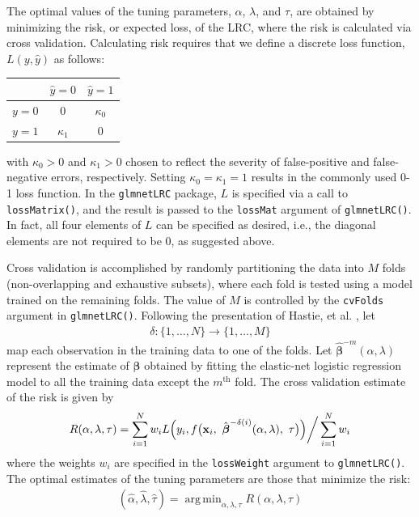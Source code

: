 \documentclass{article}
\DeclareMathOperator*{\argmin}{arg\,min}
\begin{document}
The optimal values of the tuning parameters, $\alpha$, $\lambda$, and $\tau$, are obtained by minimizing 
the risk, or expected loss, of 
the LRC, where the risk is calculated via cross validation.  Calculating risk requires that we define a discrete 
loss function, $L(y,\hat{y})$ as follows:
\begin{table}[H]
\begin{center}
\begin{tabular}{c|cc}
& $\hat{y} = 0$ & $\hat{y} = 1$ \\
\hline
$y = 0$ & $0$ & $\kappa_0$ \\
$y = 1$ & $\kappa_1$ & $0$ \\
\end{tabular}
\end{center}
\end{table}
\noindent with $\kappa_0 > 0$ and $\kappa_1 > 0$ chosen to reflect the severity of false-positive and 
false-negative errors, respectively.  Setting $\kappa_0 = \kappa_1 = 1$ results in the commonly used 0-1 loss
function.  In the {\tt glmnetLRC} package, $L$ is specified via a call to {\tt lossMatrix()}, and the result is passed to
the {\tt lossMat} argument of {\tt glmnetLRC()}.  In fact, all four elements of $L$ can be specified as desired, i.e.,
the diagonal elements are not required to be 0, as suggested above.

Cross validation is accomplished by randomly partitioning the data into $M$ folds (non-overlapping and
exhaustive subsets), where each fold is tested using a model trained on the remaining folds. 
The value of $M$ is controlled by the {\tt cvFolds} argument in 
{\tt glmnetLRC()}. Following the presentation of Hastie, et al. \citeyear{Hastie}, let
\begin{align}
\label{eq:cv_map}
\delta:\{1,\ldots,N\} \rightarrow \{1, \ldots, M\}
\end{align}
\noindent map each observation in the training data to one of the folds.
Let $\hat{\boldsymbol{\beta}}^{-m}(\alpha,\lambda)$ represent the estimate of $\boldsymbol\beta$ obtained by
fitting the elastic-net logistic regression model to all the training data except the $m^{\text{th}}$ fold.
The cross validation estimate of the risk is given by
\begin{align}
\label{eq:risk}
R(\alpha,\lambda,\tau) = \sum_{i=1}^N w_i L \Bigl(y_i, f\bigl(\mathbf{x}_i,
~\hat{\boldsymbol{\beta}}^{-\delta(i)}(\alpha,\lambda), ~\tau \bigr) \Bigr) \bigg/ \sum_{i=1}^N w_i
\end{align}
\noindent where the weights $w_i$ are specified in the {\tt lossWeight} argument to {\tt glmnetLRC()}. 
The optimal estimates of the tuning parameters are those that minimize the risk:
\begin{align}
\label{eq:tuning_estimates}
(\hat\alpha,\hat\lambda,\hat\tau) = \argmin_{\alpha,\lambda,\tau} R(\alpha,\lambda,\tau)
\end{align}
\end{document}
